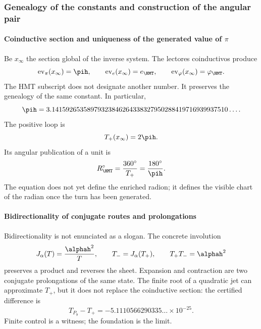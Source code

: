 
\subsubsection{Genealogy of the constants and construction of the angular pair}

\paragraph{Coinductive section and uniqueness of the generated value of \(\pi\)}

Be \(x_\infty\) the section global of the inverse system. The lectores
coinductivos produce
\[
\operatorname{ev}_\pi(x_\infty)=\pih,\qquad
\operatorname{ev}_e(x_\infty)=e_{\HMT},\qquad
\operatorname{ev}_\varphi(x_\infty)=\varphi_{\HMT}.
\]
The HMT subscript does not designate another number. It preserves the genealogy of the same
constant. In particular,
\[
\pih=3.14159265358979323846264338327950288419716939937510\ldots.
\]
The positive loop is
\begin{equation}
T_+(x_\infty)=2\pih.
\label{eq:vuelta-plus}
\end{equation}
Its angular publication of a unit is
\begin{equation}
R_{\HMT}^{\circ}=\frac{360^\circ}{T_+}=\frac{180^\circ}{\pih}.
\label{eq:radian-publicado}
\end{equation}
The equation does not yet define the enriched radion; it defines the visible
chart of the radian once the turn has been generated.

\paragraph{Bidirectionality of conjugate routes and prolongations}

Bidirectionality is not enunciated as a slogan. The concrete involution
\begin{equation}
J_\alpha(T)=\frac{\alphah^2}{T},\qquad
T_-=J_\alpha(T_+),\qquad T_+T_-=\alphah^2
\label{eq:bidireccional-turn}
\end{equation}
preserves a product and reverses the sheet. Expansion and contraction are two
conjugate prolongations of the same state. The finite root of a
quadratic jet can approximate \(T_+\), but it does not replace the
coinductive section: the certified difference is
\[
T_{P_9}-T_+=-5.1110566290335\ldots\times10^{-25}.
\]
Finite control is a witness; the foundation is the limit.

